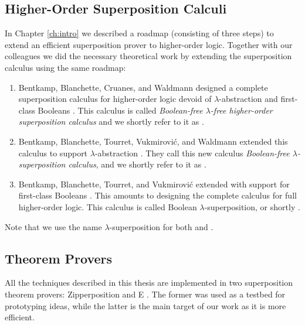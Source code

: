 \subsection{Higher-Order Superposition Calculi}
\label{sec:pre:ho-sup-calculi}

In Chapter \ref{ch:intro} we described a roadmap (consisting of three steps) to
extend an efficient superposition prover to higher-order logic. Together with
our colleagues we did the necessary theoretical work by extending the
superposition calculus using the same roadmap:

\begin{enumerate}
    \item Bentkamp, Blanchette, Cruanes, and Waldmann designed a complete
    superposition calculus for higher-order logic devoid of
    $\lambda$-abstraction and first-class Booleans \cite{bbcw-21-lfho}. This calculus is called \emph{Boolean-free $\lambda$-free higher-order superposition calculus} 
    and we shortly refer to it as \lfsup{}.
    \item \begin{sloppypar}
    Bentkamp, Blanchette, Tourret,  Vukmirović, and Waldmann
    extended this calculus to support $\lambda$-abstraction
    \cite{bbtvw-21-sup-lam}. They call this new calculus \emph{Boolean-free $\lambda$-superposition calculus},
    and we shortly refer to it as \lsup{}.
    \end{sloppypar}        
    \item Bentkamp, Blanchette, Tourret, and Vukmirovi\'c extended \lsup{} with
    support for first-class Booleans \cite{bbtv-21-full-ho-sup}. This amounts to
    designing the complete calculus for full higher-order logic. This
    calculus is called Boolean $\lambda$-superposition, or shortly \osup{}.
\end{enumerate}
%
Note that we use the name $\lambda$-superposition for both \lsup{}
and \osup{}.

\subsection{Theorem Provers}
\label{sec:pre:theorem-provers}

All the techniques described in this thesis are implemented in two superposition
theorem provers: Zipperposition
\cite{sc-15-simon-phd,sc-supind-17} and E \cite{ss-02-brainiac}. The former was used as a testbed for
prototyping ideas, while the latter is the main target of our work as it is more
efficient.


